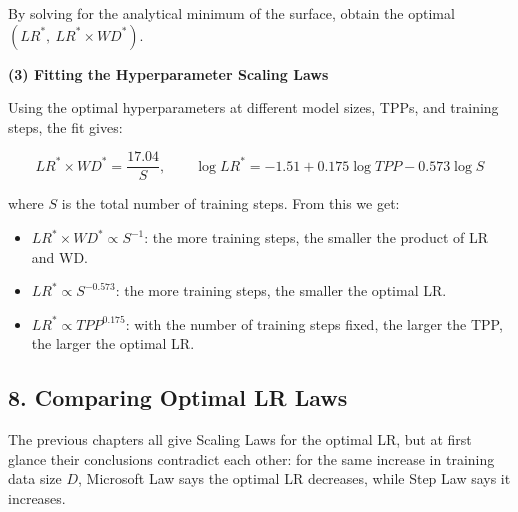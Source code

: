 \documentclass[
  english,
  11pt,
  a4paper,
]{article}
\providecommand{\tightlist}{%
  \setlength{\itemsep}{0pt}\setlength{\parskip}{0pt}}
\newenvironment{NotesFormula}{%
  \par\noindent\begin{minipage}{\linewidth}%
  \setlength{\parindent}{2em}%
  \setlength{\parskip}{0.35em}%
}{\end{minipage}\par}
\begin{document}
By solving for the analytical minimum of the surface, obtain the optimal
\((LR^*,\ LR^*\times WD^*)\).

\textbf{(3) Fitting the Hyperparameter Scaling Laws}

\begin{NotesFormula}

Using the optimal hyperparameters at different model sizes, TPPs, and
training steps, the fit gives:

\[\boxed{LR^*\times WD^*=\frac{17.04}{S}},\qquad
\boxed{\log LR^*=-1.51+0.175\log TPP-0.573\log S}\]

\end{NotesFormula}

where \(S\) is the total number of training steps. From this we get:

\begin{itemize}
\tightlist
\item
  \(LR^*\times WD^*\propto S^{-1}\): the more training steps, the
  smaller the product of LR and WD.
\item
  \(LR^*\propto S^{-0.573}\): the more training steps, the smaller the
  optimal LR.
\item
  \(LR^*\propto TPP^{0.175}\): with the number of training steps fixed,
  the larger the TPP, the larger the optimal LR.
\end{itemize}

\clearpage

\subsection{8. Comparing Optimal LR
Laws}\label{comparing-optimal-lr-laws}

The previous chapters all give Scaling Laws for the optimal LR, but at
first glance their conclusions contradict each other: for the same
increase in training data size \(D\), Microsoft Law says the optimal LR
decreases, while Step Law says it increases.
\end{document}
